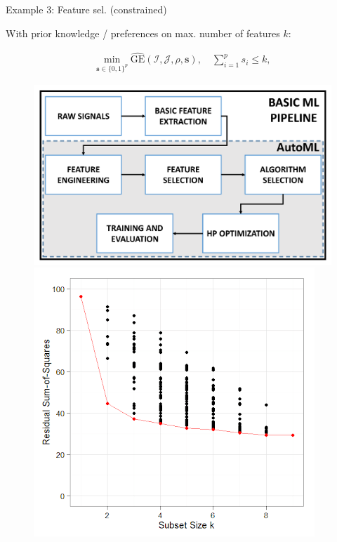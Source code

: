 \documentclass[11pt,compress,t,notes=noshow, xcolor=table]{beamer}
\begin{document}
\begin{vbframe}{Example 3: Feature sel. (constrained)}

With prior knowledge / preferences on max. number of features $k$:

\begin{eqnarray*}
\min_{\textbf{s} \in \{0, 1\}^p} \widehat{\text{GE}}(\mathcal{I}, \mathcal{J}, \rho, \bm{s}), \quad \sum\nolimits_{i = 1}^p s_i \le k, 
\end{eqnarray*}


\begin{figure}[!tbp]
  \centering
  \begin{minipage}[b]{0.5\textwidth}
    \includegraphics[width =\textwidth]{figure_man/pipeline.png}
  \end{minipage}
  \hfill
  \begin{minipage}[b]{0.4\textwidth}
    \includegraphics[width =\textwidth]{figure_man/subsetsize.png}
  \end{minipage}
\end{figure}



\end{vbframe}
\end{document}
